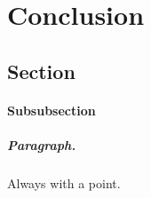 \chapter{Conclusion}
\section{Section}
%
\subsubsection{Subsubsection}

\paragraph{Paragraph.} Always with a point.

